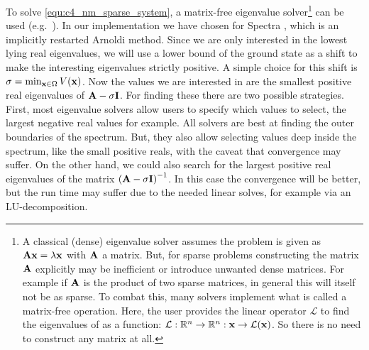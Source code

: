 
To solve \eqref{equ:c4_nm_sparse_system}, a matrix-free eigenvalue solver\footnote{A classical (dense) eigenvalue solver assumes the problem is given as $\vb{A} \vb{x} = \lambda \vb{x}$ with $\vb{A}$ a matrix. But, for sparse problems constructing the matrix $\vb{A}$ explicitly may be inefficient or introduce unwanted dense matrices. For example if $\vb{A}$ is the product of two sparse matrices, in general this will itself not be as sparse. To combat this, many solvers implement what is called a matrix-free operation. Here, the user provides the linear operator $\mathcal{L}$ to find the eigenvalues of as a function: $\mathcal{L} : \mathbb{R}^n \to \mathbb{R}^n : \vb{x} \to \mathcal{L}(\vb{x})$. So there is no need to construct any matrix at all.} can be used (e.g.~\cite{lehoucq_arpack_1998,hernandez_slepc_2005,qiu_yixuan_2022}). In our implementation we have chosen for Spectra \cite{qiu_yixuan_2022}, which is an implicitly restarted Arnoldi method. Since we are only interested in the lowest lying real eigenvalues, we will use a lower bound of the ground state as a shift to make the interesting eigenvalues strictly positive. A simple choice for this shift is $\sigma = \min_{\vb{x} \in \Omega} V(\vb{x})$. Now the values we are interested in are the smallest positive real eigenvalues of $\vb{A} - \sigma \vb{I}$. For finding these there are two possible strategies. First, most eigenvalue solvers allow users to specify which values to select, the largest negative real values for example. All solvers are best at finding the outer boundaries of the spectrum. But, they also allow selecting values deep inside the spectrum, like the small positive reals, with the caveat that convergence may suffer. On the other hand, we could also search for the largest positive real eigenvalues of the matrix $\left(\vb{A} - \sigma \vb{I}\right)^{-1}$. In this case the convergence will be better, but the run time may suffer due to the needed linear solves, for example via an LU-decomposition.

